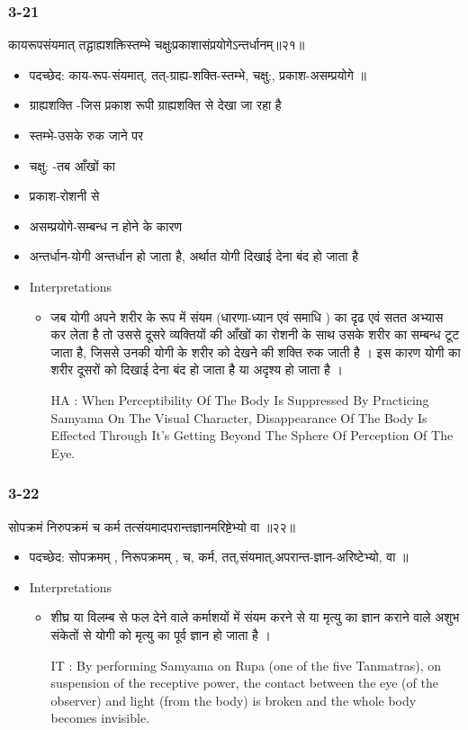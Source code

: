 \begin{frame}[fragile]\frametitle{3-21}
\begin{sanskrit}
कायरूपसंयमात् तद्ग्राह्यशक्तिस्तम्भे चक्षुःप्रकाशासंप्रयोगेऽन्तर्धानम्॥२१॥
\end{sanskrit}

	\begin{itemize}
	\item पदच्छेद:  काय-रूप-संयमात्, तत्-ग्राह्य-शक्ति-स्तम्भे, चक्षु:, प्रकाश-असम्प्रयोगे ॥
	\item ग्राह्यशक्ति -जिस प्रकाश रूपी ग्राह्यशक्ति से देखा जा रहा है
	\item स्तम्भे-उसके रुक जाने पर
	\item चक्षु: -तब आँखों का
	\item प्रकाश-रोशनी से
	\item असम्प्रयोगे-सम्बन्ध न होने के कारण
	\item अन्तर्धान-योगी अन्तर्धान हो जाता है, अर्थात योगी दिखाई देना बंद हो जाता है	
	\item Interpretations
		\begin{itemize}	
		\item जब योगी अपने शरीर के रूप में संयम (धारणा-ध्यान एवं समाधि ) का दृढ एवं सतत अभ्यास  कर लेता है तो उससे दूसरे व्यक्तियों की आँखों का रोशनी के साथ उसके शरीर का सम्बन्ध टूट जाता है, जिससे उनकी योगी के शरीर को देखने की शक्ति रुक जाती है । इस कारण योगी का शरीर दूसरों को दिखाई देना बंद हो जाता है या अदृश्य हो जाता है ।
		\item [HA]: When Perceptibility Of The Body Is Suppressed By Practicing Samyama On The Visual Character, Disappearance Of The Body Is Effected Through It’s Getting Beyond The Sphere Of Perception Of The Eye.
		\end{itemize}
	\end{itemize}
\end{frame}

\begin{frame}[fragile]\frametitle{3-22}
\begin{sanskrit}
सोपक्रमं निरुपक्रमं च कर्म तत्संयमादपरान्तज्ञानमरिष्टेभ्यो वा ॥२२॥
\end{sanskrit}

	\begin{itemize}
	\item पदच्छेद:  सोपक्रमम् , निरूपक्रमम् , च, कर्म, तत्,संयमात्,अपरान्त-ज्ञान-अरिष्टेभ्यो, वा ॥
	\item Interpretations
		\begin{itemize}	
		\item  शीघ्र या विलम्ब से फल देने वाले कर्माशयों में  संयम करने से या मृत्यु का ज्ञान कराने वाले अशुभ संकेतों से योगी को मृत्यु  का  पूर्व ज्ञान हो जाता है ।
		\item [IT]: By performing Samyama on Rupa (one of the five Tanmatras), on suspension of the receptive power, the contact between the eye (of the observer) and light (from the body) is broken and the whole body becomes invisible.
		\end{itemize}
	\end{itemize}
\end{frame}


